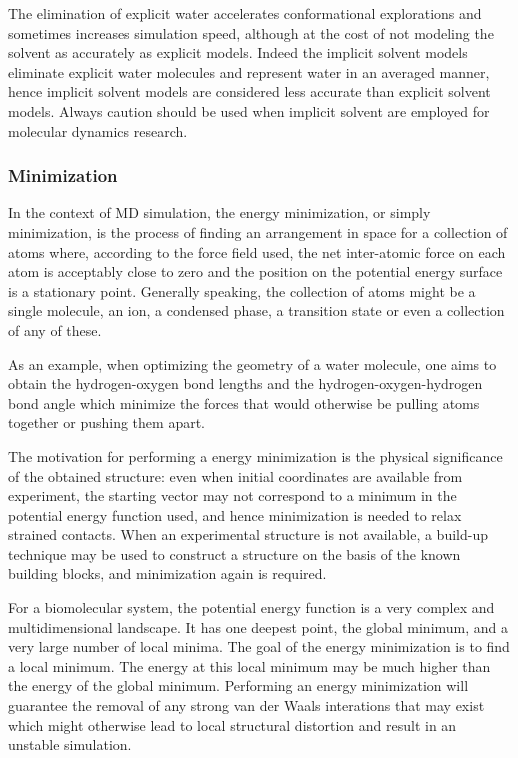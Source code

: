 The elimination of explicit water accelerates conformational explorations and sometimes increases simulation speed, although at the cost of not modeling the solvent as accurately as explicit models.
Indeed the implicit solvent models eliminate explicit water molecules and represent water in an averaged manner, hence implicit solvent models are considered less accurate than explicit solvent models. Always caution should be used when implicit solvent are employed for molecular dynamics research.

\subsubsection{Minimization}
In the context of MD simulation, the energy minimization, or simply minimization, is the process of finding an arrangement in space for a collection of atoms where, according to the force field used, the net inter-atomic force on each atom is acceptably close to zero and the position on the potential energy surface is a stationary point. Generally speaking, the collection of atoms might be a single molecule, an ion, a condensed phase, a transition state or even a collection of any of these. 

As an example, when optimizing the geometry of a water molecule, one aims to obtain the hydrogen-oxygen bond lengths and the hydrogen-oxygen-hydrogen bond angle which minimize the forces that would otherwise be pulling atoms together or pushing them apart.

The motivation for performing a energy minimization is the physical significance of the obtained structure: even when initial coordinates are available from experiment, the starting vector may not correspond to a minimum in the potential energy function used, and hence minimization is needed to relax strained contacts. When an experimental structure is not available, a build-up technique may be used to construct a structure on the basis of the known building blocks, and minimization again is required.

For a biomolecular system, the potential energy function is a very complex and multidimensional landscape. It has one deepest point, the global minimum, and a very large number of local minima. The goal of the energy minimization is to find a local minimum. The energy at this local minimum may be much higher than the energy of the global minimum. Performing an energy minimization will guarantee the removal of any strong van der Waals interations that may exist which might otherwise lead to local structural distortion and result in an unstable simulation.


